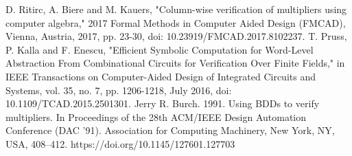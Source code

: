 \documentclass[conference]{IEEEtran}
\begin{document}
\begin{thebibliography}{03}
 D. Ritirc, A. Biere and M. Kauers, "Column-wise verification of multipliers using computer algebra," 2017 Formal Methods in Computer Aided Design (FMCAD), Vienna, Austria, 2017, pp. 23-30, doi: 10.23919/FMCAD.2017.8102237.
 T. Pruss, P. Kalla and F. Enescu, "Efficient Symbolic Computation for Word-Level Abstraction From Combinational Circuits for Verification Over Finite Fields," in IEEE Transactions on Computer-Aided Design of Integrated Circuits and Systems, vol. 35, no. 7, pp. 1206-1218, July 2016, doi: 10.1109/TCAD.2015.2501301.
 Jerry R. Burch. 1991. Using BDDs to verify multipliers. In Proceedings of the 28th ACM/IEEE Design Automation Conference (DAC '91). Association for Computing Machinery, New York, NY, USA, 408–412. https://doi.org/10.1145/127601.127703
\end{thebibliography}
\vspace{12pt}
\end{document}
